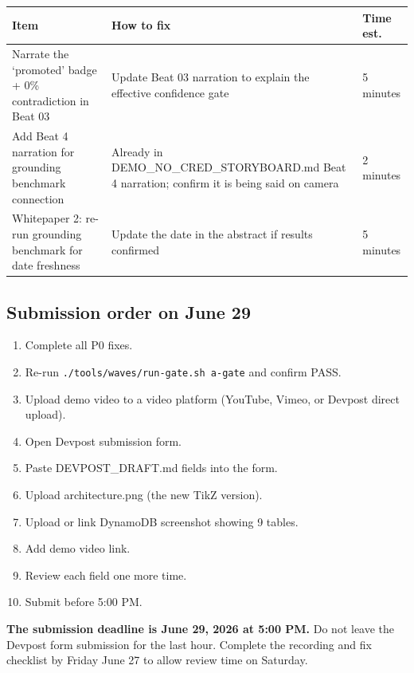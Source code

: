 \begin{center}
\small
\begin{tabular}{p{5.5cm}p{4.5cm}p{2.2cm}}
\toprule
\textbf{Item} & \textbf{How to fix} & \textbf{Time est.} \\
\midrule

Narrate the `promoted' badge + 0\% contradiction in Beat 03 &
Update Beat 03 narration to explain the effective confidence gate &
5 minutes \\

\midrule

Add Beat 4 narration for grounding benchmark connection &
Already in DEMO\_NO\_CRED\_STORYBOARD.md Beat 4 narration; confirm it is being said on camera &
2 minutes \\

\midrule

Whitepaper 2: re-run grounding benchmark for date freshness &
Update the date in the abstract if results confirmed &
5 minutes \\

\bottomrule
\end{tabular}
\end{center}

\subsection{Submission order on June 29}

\begin{enumerate}
\item Complete all P0 fixes.
\item Re-run \texttt{./tools/waves/run-gate.sh a-gate} and confirm PASS.
\item Upload demo video to a video platform (YouTube, Vimeo, or Devpost direct upload).
\item Open Devpost submission form.
\item Paste DEVPOST\_DRAFT.md fields into the form.
\item Upload architecture.png (the new TikZ version).
\item Upload or link DynamoDB screenshot showing 9 tables.
\item Add demo video link.
\item Review each field one more time.
\item Submit before 5:00 PM.
\end{enumerate}

\begin{p0box}
\textbf{The submission deadline is June 29, 2026 at 5:00 PM.} Do not leave the Devpost form submission for the last hour. Complete the recording and fix checklist by Friday June 27 to allow review time on Saturday.
\end{p0box}
